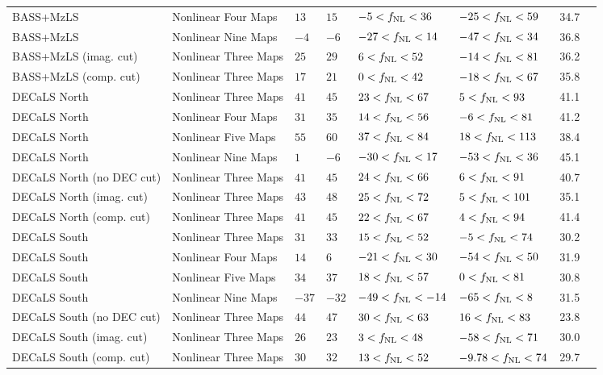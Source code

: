 \begin{table}
{\begin{tabular}{llllllll}
BASS+MzLS                 & Nonlinear Four Maps& $ 13$& $ 15$& $ -5<f_{\rm NL}< 36$& $-25<f_{\rm NL}< 59$ &   34.7\\
BASS+MzLS                 & Nonlinear Nine Maps& $ -4$& $ -6$& $-27<f_{\rm NL}< 14$& $-47<f_{\rm NL}< 34$ &   36.8\\
BASS+MzLS (imag. cut)     & Nonlinear Three Maps& $ 25$& $ 29$& $  6<f_{\rm NL}< 52$& $-14<f_{\rm NL}< 81$ &   36.2\\
BASS+MzLS (comp. cut)     & Nonlinear Three Maps& $ 17$& $ 21$& $  0<f_{\rm NL}< 42$& $-18<f_{\rm NL}< 67$ &   35.8\\
DECaLS North              & Nonlinear Three Maps& $ 41$& $ 45$& $ 23<f_{\rm NL}< 67$& $  5<f_{\rm NL}< 93$ &   41.1\\
DECaLS North              & Nonlinear Four Maps& $ 31$& $ 35$& $ 14<f_{\rm NL}< 56$& $ -6<f_{\rm NL}< 81$ &   41.2\\
DECaLS North              & Nonlinear Five Maps& $ 55$& $ 60$& $ 37<f_{\rm NL}< 84$& $ 18<f_{\rm NL}<113$ &   38.4\\
DECaLS North              & Nonlinear Nine Maps& $  1$& $ -6$& $-30<f_{\rm NL}< 17$& $-53<f_{\rm NL}< 36$ &   45.1\\
DECaLS North (no DEC cut) & Nonlinear Three Maps& $ 41$& $ 45$& $ 24<f_{\rm NL}< 66$& $  6<f_{\rm NL}< 91$ &   40.7\\
DECaLS North (imag. cut)  & Nonlinear Three Maps& $ 43$& $ 48$& $ 25<f_{\rm NL}< 72$& $  5<f_{\rm NL}<101$ &   35.1\\
DECaLS North (comp. cut)  & Nonlinear Three Maps& $ 41$& $ 45$& $ 22<f_{\rm NL}< 67$& $  4<f_{\rm NL}< 94$ &   41.4\\
DECaLS South              & Nonlinear Three Maps& $ 31$& $ 33$& $ 15<f_{\rm NL}< 52$& $ -5<f_{\rm NL}< 74$ &   30.2\\
DECaLS South              & Nonlinear Four Maps& $ 14$& $  6$& $-21<f_{\rm NL}< 30$& $-54<f_{\rm NL}< 50$ &   31.9\\
DECaLS South              & Nonlinear Five Maps& $ 34$& $ 37$& $ 18<f_{\rm NL}< 57$& $ 0<f_{\rm NL}< 81$ &   30.8\\
DECaLS South              & Nonlinear Nine Maps& $-37$& $-32$& $-49<f_{\rm NL}<-14$& $-65<f_{\rm NL}<  8$ &   31.5\\
DECaLS South (no DEC cut) & Nonlinear Three Maps& $ 44$& $ 47$& $ 30<f_{\rm NL}< 63$& $ 16<f_{\rm NL}< 83$ &   23.8\\
DECaLS South (imag. cut)  & Nonlinear Three Maps& $ 26$& $ 23$& $  3<f_{\rm NL}< 48$& $-58<f_{\rm NL}< 71$ &   30.0\\
DECaLS South (comp. cut)  & Nonlinear Three Maps& $ 30$& $ 32$& $ 13<f_{\rm NL}< 52$& $ -9.78<f_{\rm NL}< 74$ &   29.7\\
   \hline
    \end{tabular}}
\end{table}
